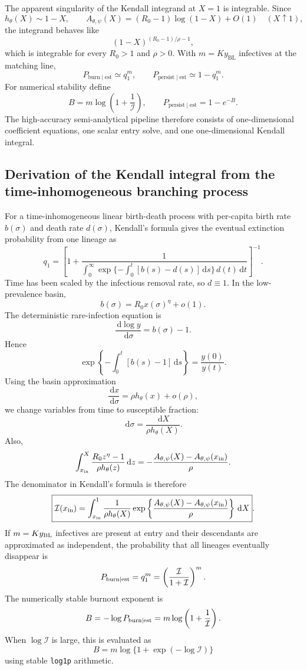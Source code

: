 \documentclass[11pt]{article}
\newcommand{\yin}{y_{\mathrm{BL}}}
\newcommand{\dd}{\,\mathrm{d}}
\begin{document}
The apparent singularity of the Kendall integrand at \(X=1\) is integrable. Since
\[
h_\theta(X)\sim1-X,
\qquad
A_{\theta,\psi}(X)= (R_0-1)\log(1-X)+O(1)
\quad (X\uparrow1),
\]
the integrand behaves like
\[
(1-X)^{(R_0-1)/\rho-1},
\]
which is integrable for every \(R_0>1\) and \(\rho>0\).
With \(m=K\yin\) infectives at the matching line,
\[
P_{\mathrm{burn}\mid\mathrm{est}}
\simeq q_1^m,
\qquad
P_{\mathrm{persist}\mid\mathrm{est}}
\simeq1-q_1^m.
\]
For numerical stability define
\[
B=m\log\left(1+\frac1{\mathcal I}\right),
\qquad
P_{\mathrm{persist}\mid\mathrm{est}}=1-e^{-B}.
\]
The high-accuracy semi-analytical pipeline therefore consists of one-dimensional coefficient equations, one scalar entry solve, and one one-dimensional Kendall integral.


\subsection{Derivation of the Kendall integral from the time-inhomogeneous branching process}
For a time-inhomogeneous linear birth-death process with per-capita birth rate \(b(\sigma)\) and death rate \(d(\sigma)\), Kendall's formula gives the eventual extinction probability from one lineage as
\[
q_1=\left[1+\frac{1}{\displaystyle\int_0^\infty
\exp\{-\int_0^t[b(s)-d(s)]\dd s\}\,d(t)\dd t}\right]^{-1}.
\]
Time has been scaled by the infectious removal rate, so \(d\equiv1\). In the low-prevalence basin,
\[
b(\sigma)=R_0x(\sigma)^\eta+o(1).
\]
The deterministic rare-infection equation is
\[
\frac{\dd\log y}{\dd\sigma}=b(\sigma)-1.
\]
Hence
\[
\exp\left\{-\int_0^t[b(s)-1]\dd s\right\}
=\frac{y(0)}{y(t)}.
\]
Using the basin approximation
\[
\frac{\dd x}{\dd\sigma}=\rho h_\theta(x)+o(\rho),
\]
we change variables from time to susceptible fraction:
\[
\dd\sigma=\frac{\dd X}{\rho h_\theta(X)}.
\]
Also,
\[
\int_{x_{\rm in}}^X\frac{R_0z^\eta-1}{\rho h_\theta(z)}\dd z
=-\frac{A_{\theta,\psi}(X)-A_{\theta,\psi}(x_{\rm in})}{\rho}.
\]
The denominator in Kendall's formula is therefore
\[
\boxed{
\mathcal I(x_{\rm in})
=\int_{x_{\rm in}}^1\frac1{\rho h_\theta(X)}
\exp\left\{\frac{A_{\theta,\psi}(X)-A_{\theta,\psi}(x_{\rm in})}{\rho}\right\}\dd X
}.
\]
If \(m=Ky_{\rm BL}\) infectives are present at entry and their descendants are approximated as independent, the probability that all lineages eventually disappear is
\[
P_{\rm burn\mid est}=q_1^m
=\left(\frac{\mathcal I}{1+\mathcal I}\right)^m.
\]
The numerically stable burnout exponent is
\[
B=-\log P_{\rm burn\mid est}
=m\log\left(1+\frac1{\mathcal I}\right).
\]
When \(\log\mathcal I\) is large, this is evaluated as
\[
B=m\log\{1+\exp(-\log\mathcal I)\}
\]
using stable \texttt{log1p} arithmetic.
\end{document}
